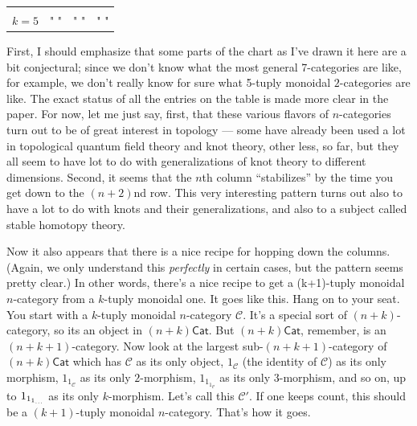 \documentclass{article}
\begin{document}
\begin{longtable}[]{@{}llll@{}}
\begin{minipage}[t]{0.21\columnwidth}
\strut
\end{minipage}\tabularnewline
\begin{minipage}[t]{0.26\columnwidth}\raggedright
\(k=5\)\strut
\end{minipage} & \begin{minipage}[t]{0.21\columnwidth}\raggedright
" "\strut
\end{minipage} & \begin{minipage}[t]{0.21\columnwidth}\raggedright
" "\strut
\end{minipage} & \begin{minipage}[t]{0.21\columnwidth}\raggedright
" "\strut
\end{minipage}\tabularnewline
\bottomrule
\end{longtable}

First, I should emphasize that some parts of the chart as I've drawn it
here are a bit conjectural; since we don't know what the most general
7-categories are like, for example, we don't really know for sure what
5-tuply monoidal \(2\)-categories are like. The exact status of all the
entries on the table is made more clear in the paper. For now, let me
just say, first, that these various flavors of \(n\)-categories turn out
to be of great interest in topology --- some have already been used a
lot in topological quantum field theory and knot theory, other less, so
far, but they all seem to have lot to do with generalizations of knot
theory to different dimensions. Second, it seems that the \(n\)th column
``stabilizes'' by the time you get down to the \((n+2)\)nd row. This
very interesting pattern turns out also to have a lot to do with knots
and their generalizations, and also to a subject called stable homotopy
theory.

Now it also appears that there is a nice recipe for hopping down the
columns. (Again, we only understand this \emph{perfectly} in certain
cases, but the pattern seems pretty clear.) In other words, there's a
nice recipe to get a (k+1)-tuply monoidal \(n\)-category from a
\(k\)-tuply monoidal one. It goes like this. Hang on to your seat. You
start with a \(k\)-tuply monoidal \(n\)-category \(\mathcal{C}\). It's a
special sort of \((n+k)\)-category, so its an object in
\((n+k)\mathsf{Cat}\). But \((n+k)\mathsf{Cat}\), remember, is an
\((n+k+1)\)-category. Now look at the largest sub-\((n+k+1)\)-category
of \((n+k)\mathsf{Cat}\) which has \(\mathcal{C}\) as its only object,
\(1_{\mathcal{C}}\) (the identity of \(\mathcal{C}\)) as its only
morphism, \(1_{1_{\mathcal{C}}}\) as its only \(2\)-morphism,
\(1_{1_{1_{\mathcal{C}}}}\) as its only \(3\)-morphism, and so on, up to
\(1_{1_{1_{\scriptsize\ldots}}}\) as its only \(k\)-morphism. Let's call
this \(\mathcal{C}'\). If one keeps count, this should be a
\((k+1)\)-tuply monoidal \(n\)-category. That's how it goes.
\end{document}
